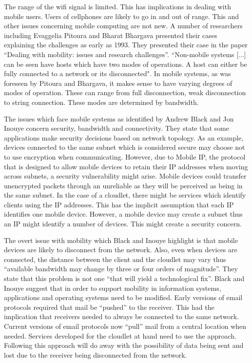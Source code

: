 The range of the wifi signal is limited. This has implications in dealing with mobile users. Users of cellphones are likely to go
in and out of range. This and other issues concerning mobile computing are not new. A number of researchers including Evaggelia Pitoura
and Bharat Bhargava presented their cases explaining the challenges as early as 1993. They presented their case in the paper ``Dealing with mobility:
issues and research challenges”\cite{pitoura1993dealing}. ``Non-mobile systems [...] can be seen have hosts which have two modes of operations. A host can either be
fully connected to a network or its disconnected"\cite[p. 4]{pitoura1993dealing}. In mobile
systems, as was foreseen by Pitoura and Bhargava\cite{pitoura1993dealing}, it makes sense to have varying degrees of modes of operation. These can range from full disconnection,
weak disconnection to string connection. These modes are determined by bandwidth.\newline

The issues which face mobile systems as identified by Andrew Black and Jon Inouye\cite{black1996system} concern security, bandwidth and connectivity.
They state that some applications make security decisions based on network topology. As an example, devices connected to the same
subnet which is considered secure may choose not to use encryption when communicating. However, due to Mobile IP, the protocol that
is designed to allow mobile devices to retain their IP addresses when moving across subnets, a security vulnerability might arise.
Mobile devices could transfer unencrypted packets through an unreliable as they will be perceived as being in the same subnet. In the
case of a cloudlet, there might be services which identify clients using the IP addresses. This has the implicit assumption that each
IP identifies one mobile device. However, a mobile device may create a subnet thus an IP might identify a number of devices. This might
create a security concern.\newline

The overt issue with mobility which Black and Inouye\cite{black1996system} highlight is that mobile devices are likely to disconnect from the network.
Also, even when devices are connected, the distance between the client and the cloudlet may vary thus “available bandwidth may change by three or four orders of magnitude”. They state that this problem is not one “that will yield a technological fix”\cite[p. 130]{black1996system}. Black and Inouye\cite{black1996system} suggest that in order to support mobility in information systems, applications and operating systems need to be modified.
Early versions of email protocols required that mail be “pushed” to the receiver. This had the implication that receivers needed to always be
connected to the same network. Current versions of email protocols now “pull” mail from a central location when needed. Services developed for the cloudlet at hand need to use the approach. Following this approach will do away with the possibility of data being sent and lost due to the
receiver being disconnected from the network.

